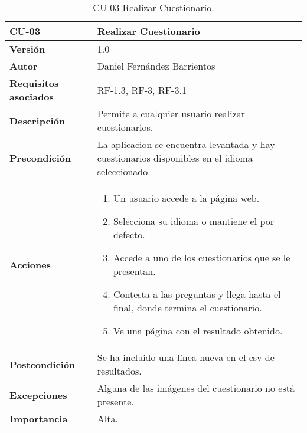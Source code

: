 \begin{table}[p]
	\centering
	\begin{tabularx}{\linewidth}{ p{} p{} }
		\toprule
		\textbf{CU-03}    & \textbf{Realizar Cuestionario}\\
		\toprule
		\textbf{Versión}              & 1.0    \\
		\textbf{Autor}                & Daniel Fernández Barrientos \\
		\textbf{Requisitos asociados} & RF-1.3, RF-3, RF-3.1 \\
		\textbf{Descripción}          & Permite a cualquier usuario realizar cuestionarios. \\
		\textbf{Precondición}         & La aplicacion se encuentra levantada y hay cuestionarios disponibles en el idioma seleccionado. \\
		\textbf{Acciones}             &
		\begin{enumerate}
			\def\labelenumi{\arabic{enumi}.}
			\tightlist
			\item Un usuario accede a la página web.
			\item Selecciona su idioma o mantiene el por defecto.
			\item Accede a uno de los cuestionarios que se le presentan.
			\item Contesta a las preguntas y llega hasta el final, donde termina el cuestionario.
			\item Ve una página con el resultado obtenido.
		\end{enumerate}\\
		\textbf{Postcondición}        & Se ha incluido una línea nueva en el csv de resultados. \\
		\textbf{Excepciones}          & Alguna de las imágenes del cuestionario no está presente. \\
		\textbf{Importancia}          & Alta. \\
		\bottomrule
	\end{tabularx}
	\caption{CU-03 Realizar Cuestionario.}
\end{table}

